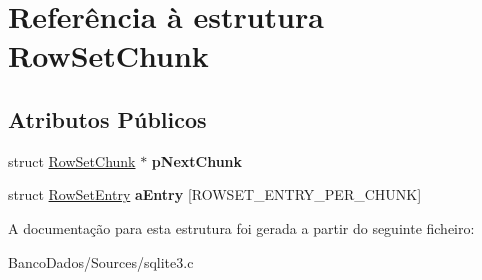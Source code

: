 \hypertarget{struct_row_set_chunk}{\section{Referência à estrutura Row\-Set\-Chunk}
\label{struct_row_set_chunk}
}
\subsection*{Atributos Públicos}
\begin{DoxyCompactItemize}
\item 
\hypertarget{struct_row_set_chunk_ae8f0975c86633ae2bb8b212d3a767554}{struct \hyperlink{struct_row_set_chunk}{Row\-Set\-Chunk} $\ast$ {\bfseries p\-Next\-Chunk}}\label{struct_row_set_chunk_ae8f0975c86633ae2bb8b212d3a767554}

\item 
\hypertarget{struct_row_set_chunk_abde97bbb07c3bf9454e719ff860bdd1f}{struct \hyperlink{struct_row_set_entry}{Row\-Set\-Entry} {\bfseries a\-Entry} \mbox{[}R\-O\-W\-S\-E\-T\-\_\-\-E\-N\-T\-R\-Y\-\_\-\-P\-E\-R\-\_\-\-C\-H\-U\-N\-K\mbox{]}}\label{struct_row_set_chunk_abde97bbb07c3bf9454e719ff860bdd1f}

\end{DoxyCompactItemize}


A documentação para esta estrutura foi gerada a partir do seguinte ficheiro\-:\begin{DoxyCompactItemize}
\item 
Banco\-Dados/\-Sources/sqlite3.\-c\end{DoxyCompactItemize}
